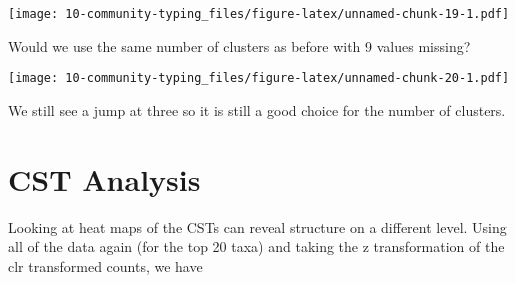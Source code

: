 \documentclass[
  oneside]{book}
\newenvironment{Shaded}{\begin{snugshade}}{\end{snugshade}}
\newcommand{\AttributeTok}[1]{\textcolor[rgb]{0.77,0.63,0.00}{#1}}
\newcommand{\CommentTok}[1]{\textcolor[rgb]{0.56,0.35,0.01}{\textit{#1}}}
\newcommand{\ConstantTok}[1]{\textcolor[rgb]{0.00,0.00,0.00}{#1}}
\newcommand{\ControlFlowTok}[1]{\textcolor[rgb]{0.13,0.29,0.53}{\textbf{#1}}}
\newcommand{\DecValTok}[1]{\textcolor[rgb]{0.00,0.00,0.81}{#1}}
\newcommand{\DocumentationTok}[1]{\textcolor[rgb]{0.56,0.35,0.01}{\textbf{\textit{#1}}}}
\newcommand{\FunctionTok}[1]{\textcolor[rgb]{0.00,0.00,0.00}{#1}}
\newcommand{\NormalTok}[1]{#1}
\newcommand{\OtherTok}[1]{\textcolor[rgb]{0.56,0.35,0.01}{#1}}
\newcommand{\SpecialCharTok}[1]{\textcolor[rgb]{0.00,0.00,0.00}{#1}}
\begin{document}
\texttt{[image: 10-community-typing\_files/figure-latex/unnamed-chunk-19-1.pdf]}

Would we use the same number of clusters as before with 9 values missing?

\begin{Shaded}
\end{Shaded}

\texttt{[image: 10-community-typing\_files/figure-latex/unnamed-chunk-20-1.pdf]}

We still see a jump at three so it is still a good choice for the number of clusters.

\hypertarget{cst-analysis}{%
\section{CST Analysis}\label{cst-analysis}}

Looking at heat maps of the CSTs can reveal structure on a different level. Using all of the data again (for the top 20 taxa) and taking the z transformation of the clr transformed counts, we have
\end{document}
